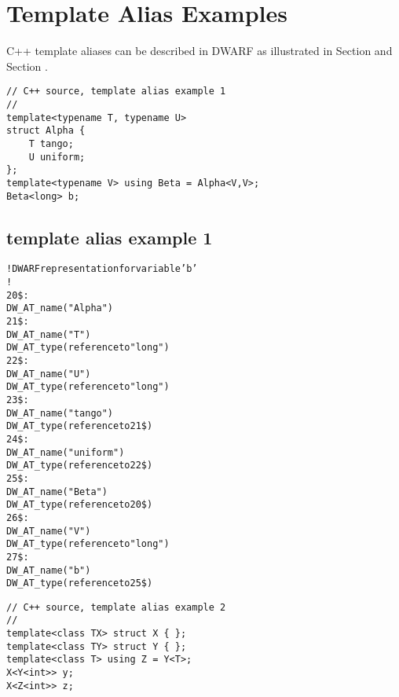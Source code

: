 \section{Template Alias Examples}
\label{app:templatealiasexample}

C++ template aliases can be described in DWARF as illustrated in 
Section 
and 
Section .


\begin{lstlisting}
// C++ source, template alias example 1
//
template<typename T, typename U>
struct Alpha {
    T tango;
    U uniform;
};
template<typename V> using Beta = Alpha<V,V>;
Beta<long> b;
\end{lstlisting}


\subsection{template alias example 1}
\label{app:templatealiasexample1}
\begin{alltt}
! DWARF representation for variable 'b'
!
20\$: 
        DW\_AT\_name("Alpha")
21\$:   
            DW\_AT\_name("T")
            DW\_AT\_type(reference to "long")
22\$:   
            DW\_AT\_name("U")
            DW\_AT\_type(reference to "long")
23\$:   
            DW\_AT\_name("tango")
            DW\_AT\_type(reference to 21\$)
24\$:   
            DW\_AT\_name("uniform")
            DW\_AT\_type(reference to 22\$)
25\$: 
        DW\_AT\_name("Beta")
        DW\_AT\_type(reference to 20\$)
26\$:   
            DW\_AT\_name("V")
            DW\_AT\_type(reference to "long")
27\$: 
        DW\_AT\_name("b")
        DW\_AT\_type(reference to 25\$)
\end{alltt}


\begin{lstlisting}
// C++ source, template alias example 2
//
template<class TX> struct X { };
template<class TY> struct Y { };
template<class T> using Z = Y<T>;
X<Y<int>> y;
X<Z<int>> z;
\end{lstlisting}


